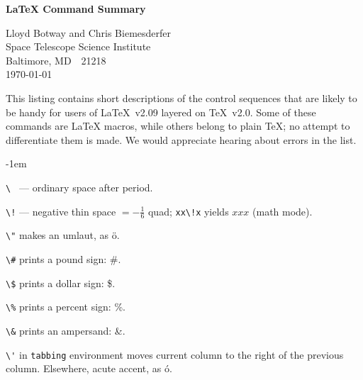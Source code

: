 


\thispagestyle{empty}

\noindent
{\large\bf \LaTeX{} Command Summary}
\smallskip

\begin{flushleft}
\hspace*{2em} Lloyd Botway and Chris Biemesderfer\\
\hspace*{2em} Space Telescope Science Institute\\
\hspace*{2em} Baltimore, MD\ \ 21218\\[.5ex]
\hspace*{2em} \today
\end{flushleft}
\smallskip

\ifsmallcrib \footnotesize \fi

\noindent
This listing contains short descriptions of the control sequences that are
likely to be handy for users of \LaTeX~v2.09 layered on \TeX~v2.0.  Some
of these commands are \LaTeX{} macros, while others belong to plain \TeX{};
no attempt to differentiate them is made.  We would
appreciate hearing about errors in the list.
\bigskip

\raggedright \parindent -1em

\verb*"\ " --- ordinary space after period.

\verb"\!" --- negative thin space $ = -\frac{1}{6} $ quad;
	\ifsmallcrib \relax \else \linebreak \fi
	\verb"xx\!x" yields $xx\!x$ (math mode).

\verb.\". makes an umlaut, as \"o.

\verb"\#" prints a pound sign: \#.

\verb"\$" prints a dollar sign: \$.

\verb"\%" prints a percent sign: \%.

\verb"\&" prints an ampersand: \&.

\verb"\'" in \verb"tabbing" environment moves current column to the right
	of the previous column. Elsewhere, acute accent, as \'o.

